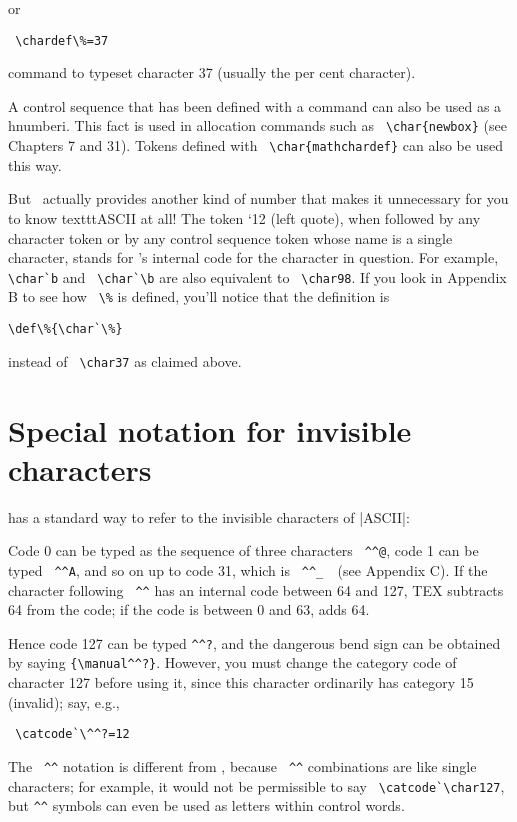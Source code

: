 or 

\verb+ \chardef\%=37   +

command to typeset character 37 (usually the per cent character).

A control sequence that has been defined with a \cmd{\chardef} command can also be used as a hnumberi.
This fact is used in allocation commands such as \verb+ \char{newbox}+ (see Chapters 7 and 31). Tokens defined
with \verb+ \char{mathchardef}+ can also be used this way.


But \tex\ actually provides another kind of number that makes it unnecessary
for you to know texttt{ASCII} at all! The token `12 (left quote), when followed by
any character token or by any control sequence token whose name is a single character,
stands for \tex's internal code for the character in question. For example, \verb+\char`b+ and
\verb+ \char`\b+ are also equivalent to \verb+ \char98+. If you look in Appendix B to see how \verb+ \%+ is
defined, you'll notice that the definition is

\verb+\def\%{\char`\%}+

instead of \verb+ \char37+  as claimed above.

\section{Special notation for invisible characters}

\tex has a standard way to refer to the invisible characters of |ASCII|: 

Code 0 can be typed as the sequence of three characters \verb+ ^^@+, code 1 can be typed
\verb+ ^^A+, and so on up to code 31, which is \verb+ ^^_  +(see Appendix C). If the character following
\verb+ ^^+ has an internal code between 64 and 127, TEX subtracts 64 from the code; if the
code is between 0 and 63, \tex adds 64. 

Hence code 127 can be typed \verb+^^?+, and
the dangerous bend sign can be obtained by saying \verb+{\manual^^?}+. However, you must
change the category code of character 127 before using it, since this character ordinarily
has category 15 (invalid); say, e.g., 

\verb+ \catcode`\^^?=12 +

The \verb+ ^^+ notation is different from
\cmd{\char}, because \verb+ ^^+ combinations are like single characters; for example, it would not
be permissible to say \verb+ \catcode`\char127+, but \verb+^^+ symbols can even be used as letters within control words.

